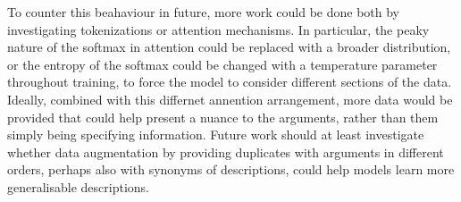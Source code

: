 To counter this beahaviour in future, more work could be done both by investigating tokenizations or attention mechanisms.
In particular, the peaky nature of the softmax in attention could be replaced with a broader distribution, or the entropy of the softmax could be changed with a temperature parameter throughout training, to force the model to consider different sections of the data.
Ideally, combined with this differnet annention arrangement, more data would be provided that could help present a nuance to the arguments, rather than them simply being specifying information. 
Future work should at least investigate whether data augmentation by providing duplicates with arguments in different orders, perhaps also with synonyms of descriptions, could help models learn more generalisable descriptions.


\begin{table}
\begin{center}
\end{center}
\end{table}
